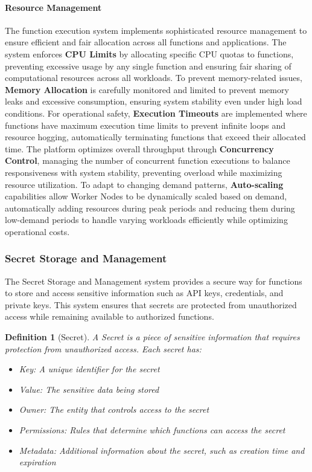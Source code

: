 \documentclass[11pt]{article}
\newtheorem{definition}{Definition}
\begin{document}
\paragraph{Resource Management}
The function execution system implements sophisticated resource management to ensure efficient and fair allocation across all functions and applications. The system enforces \textbf{CPU Limits} by allocating specific CPU quotas to functions, preventing excessive usage by any single function and ensuring fair sharing of computational resources across all workloads. To prevent memory-related issues, \textbf{Memory Allocation} is carefully monitored and limited to prevent memory leaks and excessive consumption, ensuring system stability even under high load conditions. For operational safety, \textbf{Execution Timeouts} are implemented where functions have maximum execution time limits to prevent infinite loops and resource hogging, automatically terminating functions that exceed their allocated time. The platform optimizes overall throughput through \textbf{Concurrency Control}, managing the number of concurrent function executions to balance responsiveness with system stability, preventing overload while maximizing resource utilization. To adapt to changing demand patterns, \textbf{Auto-scaling} capabilities allow Worker Nodes to be dynamically scaled based on demand, automatically adding resources during peak periods and reducing them during low-demand periods to handle varying workloads efficiently while optimizing operational costs.

\subsubsection{Secret Storage and Management}
\label{subsubsec:secret-storage}

The Secret Storage and Management system provides a secure way for functions to store and access sensitive information such as API keys, credentials, and private keys. This system ensures that secrets are protected from unauthorized access while remaining available to authorized functions.



\begin{definition}[Secret]
A Secret is a piece of sensitive information that requires protection from unauthorized access. Each secret has:
\begin{itemize}
    \item Key: A unique identifier for the secret
    \item Value: The sensitive data being stored
    \item Owner: The entity that controls access to the secret
    \item Permissions: Rules that determine which functions can access the secret
    \item Metadata: Additional information about the secret, such as creation time and expiration
\end{itemize}
\end{definition}
\end{document}
